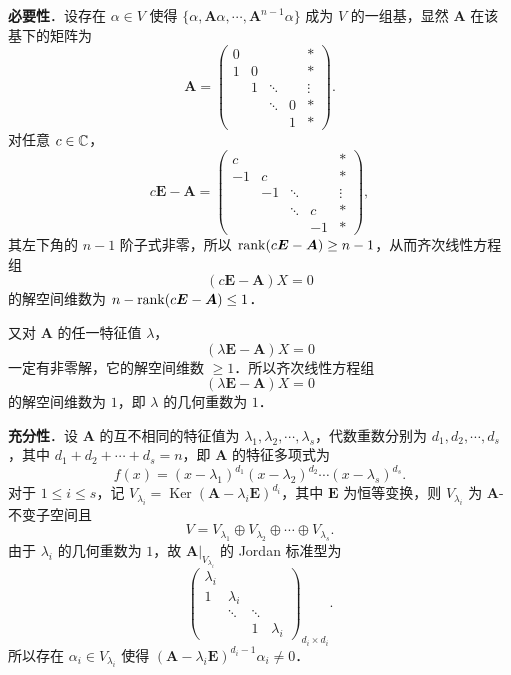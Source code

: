 \begin{solution}
\textbf{必要性}．设存在 $\alpha\in V$ 使得 $\{\alpha,\bm{A}\alpha,\cdots,\bm{A}^{n-1}\alpha\}$ 成为 $V$ 的一组基，显然 $\bm{A}$ 在该基下的矩阵为
\[
\bm{A}=
\begin{pmatrix}
0 & & & & *\\
1 & 0 & & & *\\
 & 1 & \ddots & & \vdots\\
 & & \ddots & 0 & *\\
 & & & 1 & *
\end{pmatrix}.
\]
对任意 $c\in\mathbb{C}$，
\[
c\bm{E}-\bm{A}=
\begin{pmatrix}
c & & & & *\\
-1 & c & & & *\\
 & -1 & \ddots & & \vdots\\
 & & \ddots & c & *\\
 & & & -1 & *
\end{pmatrix},
\]
其左下角的 $n-1$ 阶子式非零，所以 $\operatorname{rank}(c\bm{E}-\bm{A})\ge n-1$，从而齐次线性方程组
\[
(c\bm{E}-\bm{A})X=0
\]
的解空间维数为 $n-\operatorname{rank}(c\bm{E}-\bm{A})\le 1$．

又对 $\bm{A}$ 的任一特征值 $\lambda$，
\[
(\lambda\bm{E}-\bm{A})X=0
\]
一定有非零解，它的解空间维数 $\ge 1$．所以齐次线性方程组
\[
(\lambda\bm{E}-\bm{A})X=0
\]
的解空间维数为 $1$，即 $\lambda$ 的几何重数为 $1$．

\textbf{充分性}．设 $\bm{A}$ 的互不相同的特征值为 $\lambda_{1},\lambda_{2},\cdots,\lambda_{s}$，代数重数分别为 $d_{1},d_{2},\cdots,d_{s}$，其中 $d_{1}+d_{2}+\cdots+d_{s}=n$，即 $\bm{A}$ 的特征多项式为
\[
f(x)=(x-\lambda_{1})^{d_{1}}(x-\lambda_{2})^{d_{2}}\cdots(x-\lambda_{s})^{d_{s}}.
\]
对于 $1\le i\le s$，记 $V_{\lambda_{i}}=\operatorname{Ker}(\bm{A}-\lambda_{i}\bm{E})^{d_{i}}$，其中 $\bm{E}$ 为恒等变换，则 $V_{\lambda_{i}}$ 为 $\bm{A}$-不变子空间且
\[
V=V_{\lambda_{1}}\oplus V_{\lambda_{2}}\oplus\cdots\oplus V_{\lambda_{s}}.
\]
由于 $\lambda_{i}$ 的几何重数为 $1$，故 $\bm{A}|_{V_{\lambda_{i}}}$ 的 Jordan 标准型为
\[
\begin{pmatrix}
\lambda_{i} & & & \\
1 & \lambda_{i} & & \\
 & \ddots & \ddots & \\
 & & 1 & \lambda_{i}
\end{pmatrix}_{d_{i}\times d_{i}}.
\]
所以存在 $\alpha_{i}\in V_{\lambda_{i}}$ 使得 $(\bm{A}-\lambda_{i}\bm{E})^{d_{i}-1}\alpha_{i}\neq 0$．


\end{solution}
